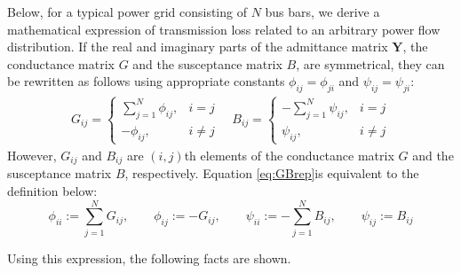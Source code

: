 \documentclass[tombow,dvipdfmx]{corona-a5-1.1}
\begin{document}
Below, for a typical power grid consisting of $N$ bus bars, we derive a mathematical expression of transmission loss related to an arbitrary power flow distribution.
If the real and imaginary parts of the admittance matrix $\bm{Y}$, the conductance matrix $G$ and the susceptance matrix $B$, are symmetrical, they can be rewritten as follows using appropriate constants $\phi_{ij}=\phi_{ji}$ and $\psi_{ij}=\psi_{ji}$:
\begin{align}\label{eq:GBrep}
G_{ij} =
\left\{
\begin{array}{cl}
\textstyle \sum_{j=1}^{N} \phi_{ij}, & i=j \\
-\phi_{ij}, & i\neq j 
\end{array}
\right.
\quad
B_{ij}  =
\left\{
\begin{array}{cl}
\textstyle - \sum_{j=1}^{N} \psi_{ij}, & i=j \\
\psi_{ij}, & i\neq j 
\end{array}
\right.
\end{align}
However, $G_{ij}$ and $B_{ij}$ are $(i,j)$th elements of the conductance matrix $G$ and the susceptance matrix $B$, respectively.
Equation \ref{eq:GBrep}is equivalent to the definition below:
\[
\phi_{ii}:= \sum_{j=1}^N G_{ij},\qquad
\phi_{ij}:=-G_{ij},\qquad 
\psi_{ii}:= - \sum_{j=1}^N B_{ij},\qquad 
\psi_{ij}:=B_{ij}
\]

Using this expression, the following facts are shown.
\end{document}
